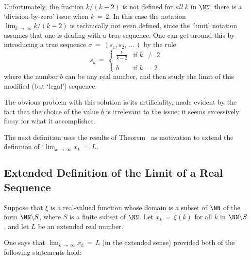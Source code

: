         Unfortunately, the fraction $k/(k-2)$ is not defined for {\em all} $k$ in ${\NN}$: there is a `division-by-zero' issue when $k \,=\, 2$.
    In this case the notation ${\displaystyle \lim_{k \,{\rightarrow}\, {\infty}} k/(k-2)}$ is technically not even defined,
    since the `limit' notation assumes that one is dealing with a true sequence. One can get around this
    by introducing a true sequence ${\sigma} \,=\, (s_{1},s_{2},\,{\ldots}\,)$ by the rule
        \begin{displaymath}
        s_{k} \,=\, 
        \left\{
        \begin{array}{cl}
     {\displaystyle \frac{k}{k-2}} & \mbox{if $k \,\,{\neq}\,\, 2$} \\
                                      &                                     \\
                b                     & \mbox{if $k \,=\, 2$}
        \end{array}
        \right.
        \end{displaymath}
    where the number $b$ can be any real number, and then study the limit of this modified (but `legal') sequence.

        The obvious problem with this solution is its artificiality, made evident by the fact that the choice of the value $b$ is irrelevant to the issue;
    it seems excessively fussy for what it accomplishes.

    The next definition uses the results of Theorem~ as motivation
    to extend the definition of `$\lim_{k \,{\rightarrow}\, {\infty}} x_{k} \,=\, L$.

\V

            \subsection{\small{\bf Extended Definition} of the Limit of a Real Sequence}
            \label{DefC10.40}

\V

    Suppose that ${\xi}$ is a real-valued function whose domain is a subset of ${\NN}$ of the form ${\NN}{\setminus}S$,
    where $S$ is a finite subset of ${\NN}$. Let $x_{k} \,=\, {\xi}(k)$ for all $k$ in ${\NN}{\setminus}S$,
    and let $L$ be an extended real number.

    One says that $\lim_{k \,{\rightarrow}\, {\infty}} x_{k} \,=\, L$ (in the extended sense) provided both of the following statements hold:


